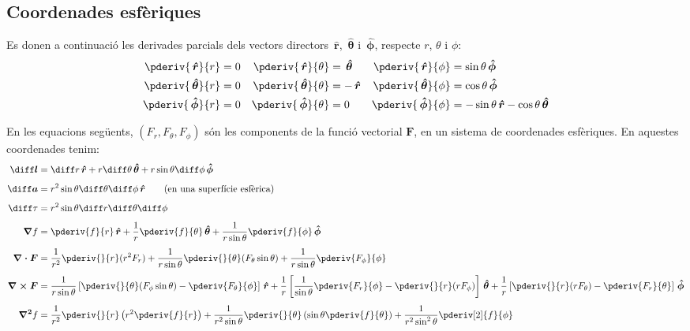 \documentclass[catalan,a4paper,twoside,11pt]{article}
\begin{document}
\subsection{Coordenades esf\`{e}riques}

\renewcommand{\va}{\ensuremath{\,\boldsymbol{\hat{r}}}}
\renewcommand{\vb}{\ensuremath{\,\boldsymbol{\hat{\theta}}}}
\renewcommand{\vc}{\ensuremath{\,\boldsymbol{\hat{\phi}}}}

Es donen a continuaci\'{o} les derivades parcials dels vectors directors $\va$, $\vb$ i $\vc$, respecte  $r$, $\theta$ i $\phi$:
\begin{subequations}
\begin{align}
   \pderiv{\va}{r} &= 0 & \pderiv{\va}{\theta} &= \vb  & \pderiv{\va}{\phi} &= \sin\theta\vc \\
   \pderiv{\vb}{r} &= 0 & \pderiv{\vb}{\theta} &= -\va & \pderiv{\vb}{\phi} &= \cos\theta\vc \\
   \pderiv{\vc}{r} &= 0 & \pderiv{\vc}{\theta} &= 0    & \pderiv{\vc}{\phi} &= -\sin\theta\va-\cos\theta\vb
\end{align}
\end{subequations}

En les equacions seg\"{u}ents, $(F_r,F_\theta,F_\phi)$  s\'{o}n
les components de la funci\'{o}  vectorial  $\boldsymbol{F}$, en un sistema de
coordenades esf\`{e}riques. En aquestes coordenades tenim:
\begin{align}
    \boldsymbol{\diff l} &= \diff r \va + r\diff\theta \vb + r \sin\theta\diff \phi \vc\\[1ex]
    \boldsymbol{\diff a} &= r^2 \sin\theta \diff \theta \diff \phi \va\qquad\text{(en una superf\'{\i}cie esf\`{e}rica)}\\[1ex]
    \diff\tau &= r^2 \sin\theta\diff r \diff \theta \diff \phi\\[1ex]
    \boldsymbol{\nabla}f &= \pderiv{f}{r}\va + \frac{1}{r}\pderiv{f}{\theta}\vb
    + \frac{1}{r\sin\theta}\pderiv{f}{\phi}\vc\\[1ex]
    \boldsymbol{\nabla\cdot F} &= \frac{1}{r^2}\pderiv{}{r}(r^2 F_r) +
    \frac{1}{r\sin\theta}\pderiv{}{\theta}(F_\theta\sin\theta)+
    \frac{1}{r\sin\theta}\pderiv{F_\phi}{\phi}\\[1ex]
    \boldsymbol{\nabla\times F} &= \frac{1}{r\sin\theta}\left[\pderiv{}{\theta}
    (F_\phi\sin\theta)-\pderiv{F_\theta}{\phi}\right]\va +
    \frac{1}{r}\left[\frac{1}{\sin\theta}\pderiv{F_r}{\phi}-
    \pderiv{}{r}(r F_\phi)\right]\vb +\frac{1}{r}\left[\pderiv{}{r}(r F_\theta)-\pderiv{F_r}{\theta}\right]\vc\\[1ex]
    \boldsymbol{\nabla^2}f &= \frac{1}{r^2}\pderiv{}{r}\left(r^2\pderiv{f}{r}
    \right) + \frac{1}{r^2\sin\theta}\pderiv{}{\theta}\left(\sin\theta\pderiv{f}{\theta}\right) +
    \frac{1}{r^2\sin^2\theta}\pderiv[2]{f}{\phi}
\end{align}
\end{document}
